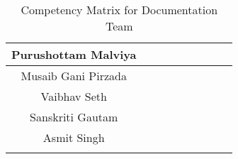 \begin{center}
\begin{longtable}{|c|c|c|c|c|c|p{1.2cm}|c|c|}
Purushottam Malviya     & \cellcolor[HTML]{FFFF00} & \cellcolor[HTML]{FFFF00} & \cellcolor[HTML]{FFFF00} & \cellcolor[HTML]{FFC000} & \cellcolor[HTML]{D9D9D9} & \cellcolor[HTML]{D9D9D9} & \cellcolor[HTML]{D9D9D9} & \cellcolor[HTML]{FFC000} \\ \hline
Musaib Gani Pirzada     & \cellcolor[HTML]{00B050} & \cellcolor[HTML]{FFFF00} & \cellcolor[HTML]{FFFF00} & \cellcolor[HTML]{92D050} & \cellcolor[HTML]{FFFF00} & \cellcolor[HTML]{00B050} & \cellcolor[HTML]{FFC000} & \cellcolor[HTML]{FFC000} \\ \hline
Vaibhav Seth            & \cellcolor[HTML]{00B050} & \cellcolor[HTML]{92D050} & \cellcolor[HTML]{FFFF00} & \cellcolor[HTML]{92D050} & \cellcolor[HTML]{D9D9D9} & \cellcolor[HTML]{D9D9D9} & \cellcolor[HTML]{FFC000} & \cellcolor[HTML]{D9D9D9} \\ \hline
Sanskriti Gautam        & \cellcolor[HTML]{FFFF00} & \cellcolor[HTML]{92D050} & \cellcolor[HTML]{FFFF00} & \cellcolor[HTML]{FFFF00} & \cellcolor[HTML]{FFC000} & \cellcolor[HTML]{FFC000} & \cellcolor[HTML]{D9D9D9} & \cellcolor[HTML]{D9D9D9} \\ \hline
Asmit Singh             & \cellcolor[HTML]{92D050} & \cellcolor[HTML]{FFFF00} & \cellcolor[HTML]{00B050} & \cellcolor[HTML]{FFFF00} & \cellcolor[HTML]{D9D9D9} & \cellcolor[HTML]{D9D9D9} & \cellcolor[HTML]{D9D9D9} & \cellcolor[HTML]{D9D9D9} \\ \hline
\caption{Competency Matrix for Documentation Team}
\end{longtable}
\setlength\LTleft{0cm}
\end{center}


